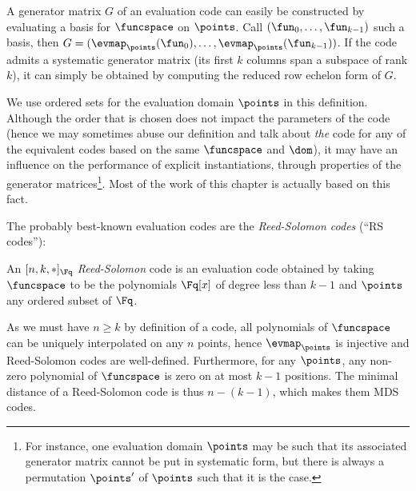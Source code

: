 A generator matrix $G$ of an evaluation code can easily be constructed by evaluating a basis for $\funcspace$ on $\points$. Call $(\fun_0,\ldots,\fun_{k-1})$
such a basis, then $G = (\evmap_\points(\fun_0),\ldots,\evmap_\points(\fun_{k-1}))$.
If the code admits a systematic generator matrix (\ie its first $k$ columns span a subspace of rank $k$), it can simply be obtained by computing the reduced row echelon form of $G$.

We use ordered sets for the evaluation domain $\points$ in this definition. Although the order that is chosen does not impact the parameters of the code (hence we
may sometimes abuse our definition and talk about \emph{the} code for any of the equivalent codes based on the same $\funcspace$ and $\dom$), it may have
an influence on the performance of explicit instantiations, through \eg properties of the generator matrices\footnote{For instance, one
evaluation domain $\points$ may be such that its associated generator matrix cannot be put in systematic form, but there is always
a permutation $\points'$ of $\points$ such that it is the case.}. Most of the work
of this chapter is actually based on this fact.

The probably best-known evaluation codes are the \emph{Reed-Solomon codes} (``RS codes''):

\begin{defi}
An $[n,k,\ast]_{\Fq}$ \emph{Reed-Solomon} code is an evaluation code obtained by taking $\funcspace$ to be the polynomials $\Fq[x]$
of degree less than $k-1$ and $\points$ any ordered subset of $\Fq$. 
\end{defi}

As we must have $n \geq k$ by definition of a code, all polynomials of $\funcspace$
can be uniquely interpolated on any $n$ points, hence $\evmap_\points$ is injective and Reed-Solomon codes are well-defined.
Furthermore, for any $\points$, any non-zero polynomial of $\funcspace$ is zero on at most $k - 1$ positions. The minimal distance of a Reed-Solomon code is thus $n - (k - 1)$, which makes them MDS codes.
